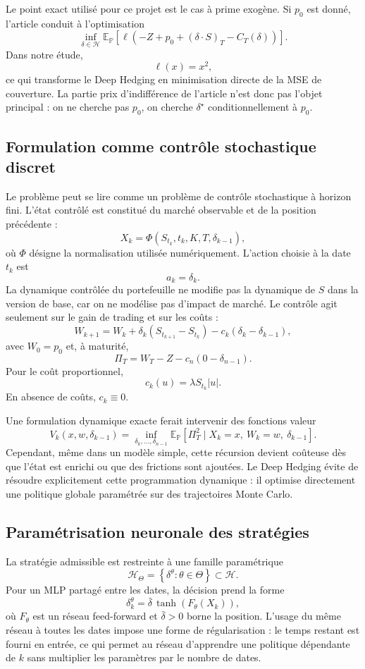 \documentclass[11pt,a4paper]{article}
\begin{document}
Le point exact utilisé pour ce projet est le cas à prime exogène. Si $p_0$ est
donné, l'article conduit à l'optimisation
\[
\inf_{\delta\in\mathcal{H}}
\mathbb{E}_{\mathbb{P}}
\left[
\ell\left(
-Z+p_0+(\delta\cdot S)_T-C_T(\delta)
\right)
\right].
\]
Dans notre étude,
\[
\ell(x)=x^2,
\]
ce qui transforme le Deep Hedging en minimisation directe de la MSE de
couverture. La partie prix d'indifférence de l'article n'est donc pas l'objet
principal : on ne cherche pas $p_0$, on cherche $\delta^\star$ conditionnellement
à $p_0$.

\subsection{Formulation comme contrôle stochastique discret}

Le problème peut se lire comme un problème de contrôle stochastique à horizon
fini. L'état contrôlé est constitué du marché observable et de la position
précédente :
\[
X_k=\Phi(S_{t_k},t_k,K,T,\delta_{k-1}),
\]
où $\Phi$ désigne la normalisation utilisée numériquement. L'action choisie à
la date $t_k$ est
\[
a_k=\delta_k.
\]
La dynamique contrôlée du portefeuille ne modifie pas la dynamique de $S$ dans
la version de base, car on ne modélise pas d'impact de marché. Le contrôle
agit seulement sur le gain de trading et sur les coûts :
\[
W_{k+1}
=W_k+\delta_k(S_{t_{k+1}}-S_{t_k})
-c_k(\delta_k-\delta_{k-1}),
\]
avec $W_0=p_0$ et, à maturité,
\[
\Pi_T=W_T-Z-c_n(0-\delta_{n-1}).
\]
Pour le coût proportionnel,
\[
c_k(u)=\lambda S_{t_k}|u|.
\]
En absence de coûts, $c_k\equiv 0$.

Une formulation dynamique exacte ferait intervenir des fonctions valeur
\[
V_k(x,w,\delta_{k-1})
=
\inf_{\delta_k,\ldots,\delta_{n-1}}
\mathbb{E}_{\mathbb{P}}
\left[
\Pi_T^2
\mid X_k=x,\ W_k=w,\ \delta_{k-1}
\right].
\]
Cependant, même dans un modèle simple, cette récursion devient coûteuse dès
que l'état est enrichi ou que des frictions sont ajoutées. Le Deep Hedging évite
de résoudre explicitement cette programmation dynamique : il optimise
directement une politique globale paramétrée sur des trajectoires Monte Carlo.

\subsection{Paramétrisation neuronale des stratégies}

La stratégie admissible est restreinte à une famille paramétrique
\[
\mathcal{H}_{\Theta}
=
\left\{
\delta^\theta:\theta\in\Theta
\right\}
\subset\mathcal{H}.
\]
Pour un MLP partagé entre les dates, la décision prend la forme
\[
\delta_k^\theta
=
\bar{\delta}\,
\tanh\left(F_\theta(X_k)\right),
\]
où $F_\theta$ est un réseau feed-forward et $\bar{\delta}>0$ borne la position.
L'usage du même réseau à toutes les dates impose une forme de régularisation :
le temps restant est fourni en entrée, ce qui permet au réseau d'apprendre une
politique dépendante de $k$ sans multiplier les paramètres par le nombre de
dates.
\end{document}
